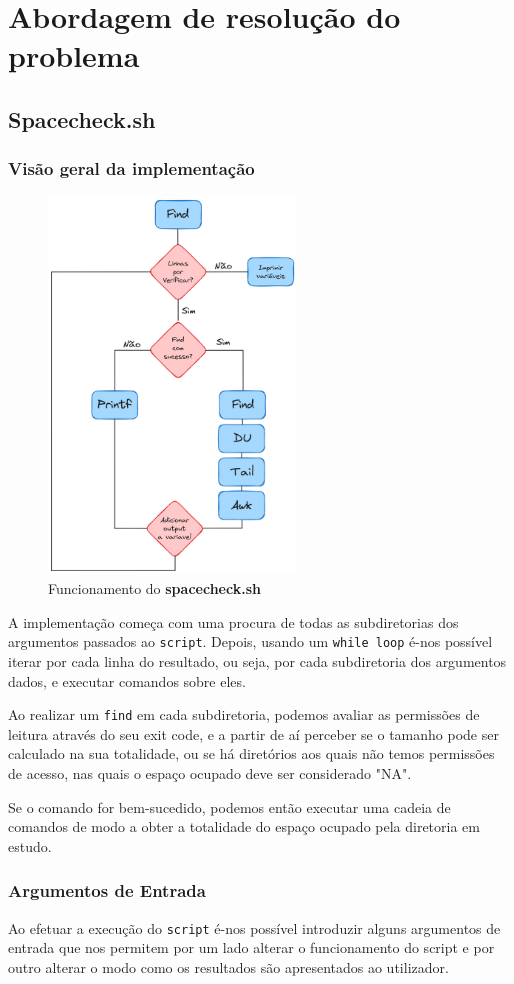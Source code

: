 \chapter{Abordagem de resolução do problema}
\section{Spacecheck.sh}
\subsection{Visão geral da implementação}
\begin{figure}[H]
    \centering
    \includegraphics[height=10cm]{Fluxograma_Implementacao.png}
    \caption{Funcionamento do \textbf{spacecheck.sh}}
\end{figure}
A implementação começa com uma procura de todas as
subdiretorias dos argumentos passados ao \verb|script|.
Depois, usando um \verb|while loop| é-nos possível iterar
por cada linha do resultado, ou seja, por cada subdiretoria
dos argumentos dados, e executar comandos sobre eles.

Ao realizar um \verb|find| em cada subdiretoria, podemos avaliar as
permissões de leitura através do seu exit code,
e a partir de aí perceber se o tamanho pode ser calculado na
sua totalidade, ou se há diretórios aos quais não temos
permissões de acesso, nas quais o espaço ocupado deve ser 
considerado "NA".

Se o comando for bem-sucedido, podemos então executar uma
cadeia de comandos de modo a obter a totalidade do espaço
ocupado pela diretoria em estudo.
\subsection{Argumentos de Entrada}
   Ao efetuar a execução do \verb|script| é-nos possível
   introduzir alguns argumentos de entrada que nos permitem
   por um lado alterar o funcionamento do script e por outro
   alterar o modo como os resultados são apresentados ao
   utilizador.

